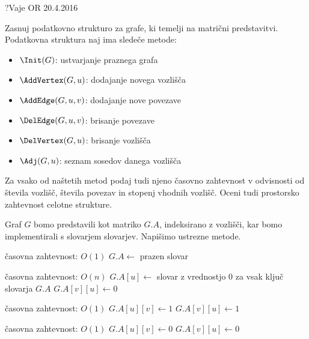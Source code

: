 \begin{naloga}{?}{Vaje OR 20.4.2016}
\begin{vprasanje}
Zasnuj podatkovno strukturo za grafe,
ki temelji na matrični predstavitvi.
Podatkovna struktura naj ima sledeče metode:
\begin{itemize}
\item $\Init(G)$: ustvarjanje praznega grafa
\item $\AddVertex(G, u)$: dodajanje novega vozlišča
\item $\AddEdge(G, u, v)$: dodajanje nove povezave
\item $\DelEdge(G, u, v)$: brisanje povezave
\item $\DelVertex(G, u)$: brisanje vozlišča
\item $\Adj(G, u)$: seznam sosedov danega vozlišča
\end{itemize}
Za vsako od naštetih metod podaj tudi njeno časovno zahtevnost
v odvisnosti od števila vozlišč, števila povezav in stopenj vhodnih vozlišč.
Oceni tudi prostorsko zahtevnost celotne strukture.
\end{vprasanje}

\begin{odgovor}
Graf $G$ bomo predstavili kot matriko $G.A$, indeksirano z vozlišči,
kar bomo implementirali s slovarjem slovarjev.
Napišimo ustrezne metode.

\begin{small}
\begin{algorithmic}
 \hfill časovna zahtevnost: $O(1)$
    \State $G.A \gets$ prazen slovar
\EndFunction
\end{algorithmic}

\begin{algorithmic}
 \hfill časovna zahtevnost: $O(n)$
    \State $G.A[u] \gets$ slovar z vrednostjo $0$ za vsak ključ slovarja $G.A$
        \State $G.A[v][u] \gets 0$
    \EndFor
\EndFunction
\end{algorithmic}

\begin{algorithmic}
 \hfill časovna zahtevnost: $O(1)$
    \State $G.A[u][v] \gets 1$
    \State $G.A[v][u] \gets 1$
\EndFunction
\end{algorithmic}

\begin{algorithmic}
 \hfill časovna zahtevnost: $O(1)$
    \State $G.A[u][v] \gets 0$
    \State $G.A[v][u] \gets 0$
\EndFunction
\end{algorithmic}


\end{small}
\end{odgovor}
\end{naloga}
